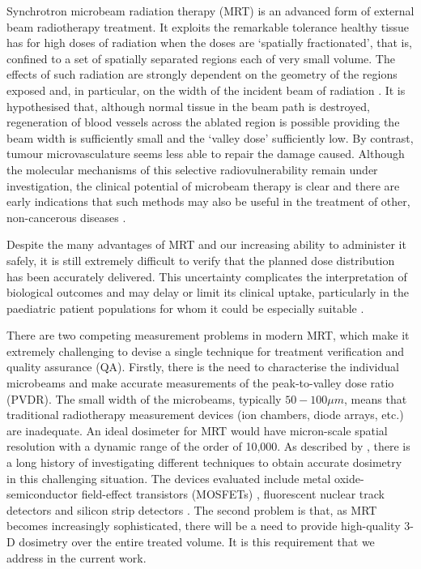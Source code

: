 \documentclass[12pt]{article}
\begin{document}
Synchrotron microbeam radiation therapy (MRT) is an advanced form of external beam radiotherapy treatment. It exploits the remarkable tolerance healthy tissue has for high doses of radiation when the doses are `spatially fractionated', that is, confined to a set of spatially separated regions each of very small volume. The effects of such radiation are strongly dependent on the geometry of the regions exposed and, in particular, on the width of the incident beam of radiation \cite{brauer-krischeffects2010}. It is hypothesised that, although normal tissue in the beam path is destroyed, regeneration of blood vessels across the ablated region is possible providing the beam width is sufficiently small and the `valley dose' sufficiently low. By contrast, tumour microvasculature seems less able to repair the damage caused. Although the molecular mechanisms of this selective radiovulnerability remain under investigation, the clinical potential of microbeam therapy is clear \cite{crosbie2010tumor} and there are early indications that such methods may also be useful in the treatment of other, non-cancerous diseases \cite{pouyatos2013synchrotron}.

Despite the many advantages of MRT and our increasing ability to administer it safely, it is still extremely difficult to verify that the planned dose distribution has been accurately delivered. This uncertainty complicates the interpretation of biological outcomes and may delay or limit its clinical uptake, particularly in the paediatric patient populations for whom it could be especially suitable \cite{laissue2001weanling}.

There are two competing measurement problems in modern MRT, which make it extremely challenging to devise a single technique for treatment verification and quality assurance (QA). Firstly, there is the need to characterise the individual microbeams and make accurate measurements of the peak-to-valley dose ratio (PVDR). The small width of the microbeams, typically $50-100\mu m$, means that traditional radiotherapy measurement devices (ion chambers, diode arrays, etc.) are inadequate. An ideal dosimeter for MRT would have micron-scale spatial resolution with a dynamic range of the order of 10,000. As described by \cite{brauer-krischpotential2010}, there is a long history of investigating different techniques to obtain accurate dosimetry in this challenging situation. The devices evaluated include metal oxide-semiconductor field-effect transistors (MOSFETs) \cite{brauer2003mosfet, siegbahnmosfet2009}, fluorescent nuclear track detectors \cite{akselrod2006novel} and silicon strip detectors \cite{lerch2011dosimetry}. The second problem is that, as MRT becomes increasingly sophisticated, there will be a need to provide high-quality 3-D dosimetry over the entire treated volume. It is this requirement that we address in the current work.
\end{document}
